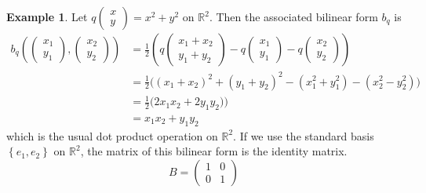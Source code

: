 \documentclass[12pt]{article}
\theoremstyle{definition}
\newtheorem{example}[theorem]{Example}
\numberwithin{theorem}{subsection}
\newcommand{\R}{\mathbb{R}}
\newcommand{\lp}{\left(}
\newcommand{\rp}{\right)}
\newcommand{\lb}{\left\{}
\newcommand{\rb}{\right\}}
\begin{document}
\begin{example}
Let $q \begin{pmatrix} x \\ y \end{pmatrix} = x^2+ y^2$ on $\R^2$. Then the associated bilinear form $b_q$ is
\begin{align*}
	b_q \lp
	\begin{pmatrix}
		x_1 \\
		y_1
	\end{pmatrix}
	,
	\begin{pmatrix}
		x_2 \\
		y_2
	\end{pmatrix}
	\rp  &= \frac 12 \lp
	q 
	\begin{pmatrix}
		x_1 + x_2 \\
		y_1 + y_2
	\end{pmatrix}
	-
	q 
	\begin{pmatrix}
		x_1 \\
		y_1
	\end{pmatrix} 
	-
	q 
	\begin{pmatrix}
		x_2 \\
		y_2
	\end{pmatrix}
	\rp \\
	&= \frac 12 \Big( (x_1+x_2)^2 + (y_1 + y_2)^2 - (x_1^2 + y_1^2) - (x_2^2 - y_2^2) \Big) \\
	&= \frac 12 \Big( 2x_1 x_2 + 2y_1 y_2) \Big) \\
	&= x_1 x_2 + y_1 y_2
\end{align*}
which is the usual dot product operation on $\R^2$. If we use the standard basis $\lb e_1, e_2 \rb$ on $\R^2$, the matrix of this bilinear form is the identity matrix.
\[
	B =
	\begin{pmatrix}
		1 & 0 \\
		0 & 1
	\end{pmatrix}
\]
\end{example}
\end{document}
